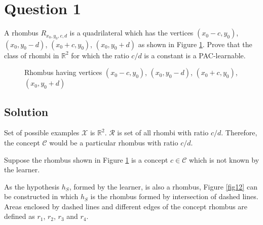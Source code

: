 \section*{Question 1}

A rhombus $R_{x_0, y_0, c, d}$ is a quadrilateral which has the vertices $(x_0-c, y_0)$, $(x_0, y_0-d)$, $(x_0+c, y_0)$, $(x_0, y_0+d)$ as shown in Figure \ref{fig11}. Prove that the class of rhombi  in $\mathbb{R}^2$ for which the ratio $c/d$ is a constant is a PAC-learnable.

\begin{figure}[H]
\centering
{}
\caption{Rhombus having vertices $(x_0-c, y_0)$, $(x_0, y_0-d)$, $(x_0+c, y_0)$, $(x_0, y_0+d)$}\label{fig11}
\end{figure}

\subsection*{Solution}

Set of possible examples $\mathcal{X}$ is $\mathbb{R}^2$.
$\mathcal{R}$ is set of all rhombi with ratio $c/d$.
Therefore, the concept $\mathcal{C}$ would be a particular rhombus with ratio $c/d$.

Suppose the rhombus shown in Figure \ref{fig11} is a concept $c \in \mathcal{C}$ which is not known by the learner.

As the hypothesis $h_S$, formed by the learner, is also a rhombus, Figure \ref{fig12} can be constructed in which $h_S$ is the rhombus formed by intersection of dashed lines. Areas enclosed by dashed lines and different edges of the concept rhombus are defined as $r_1$, $r_2$, $r_3$ and $r_4$.

